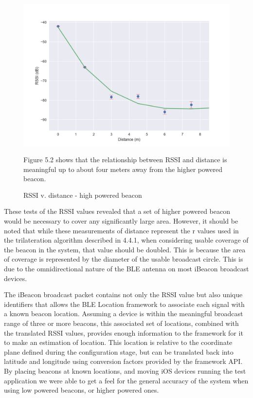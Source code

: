 \begin{figure}[h]
\includegraphics[width=.85\textwidth]{images/Estimote.png}
\caption{RSSI v. distance - high powered beacon}
\vspace{1em}
Figure 5.2 shows that the relationship between RSSI and distance is meaningful up to about four meters away from the higher powered beacon.
\end{figure}

These tests of the RSSI values revealed that a set of higher powered beacon would be necessary to cover any significantly large area.  However, it should be noted that while these measurements of distance represent the r values used in the trilateration algorithm described in 4.4.1, when considering usable coverage of the beacon in the system, that value should be doubled.  This is because the area of coverage is represented by the diameter of the usable broadcast circle.  This is due to the omnidirectional nature of the BLE antenna on most iBeacon broadcast devices.

The iBeacon broadcast packet contains not only the RSSI value but also unique identifiers that allows the BLE Location framework to associate each signal with a known beacon location.  Assuming a device is within the meaningful broadcast range of three or more beacons, this associated set of locations, combined with the translated RSSI values, provides enough information to the framework for it to make an estimation of location.  This location is relative to the coordinate plane defined during the configuration stage, but can be translated back into latitude and longitude using conversion factors provided by the framework API.  By placing beacons at known locations, and moving iOS devices running the test application we were able to get a feel for the general accuracy of the system when using low powered beacons, or higher powered ones.
